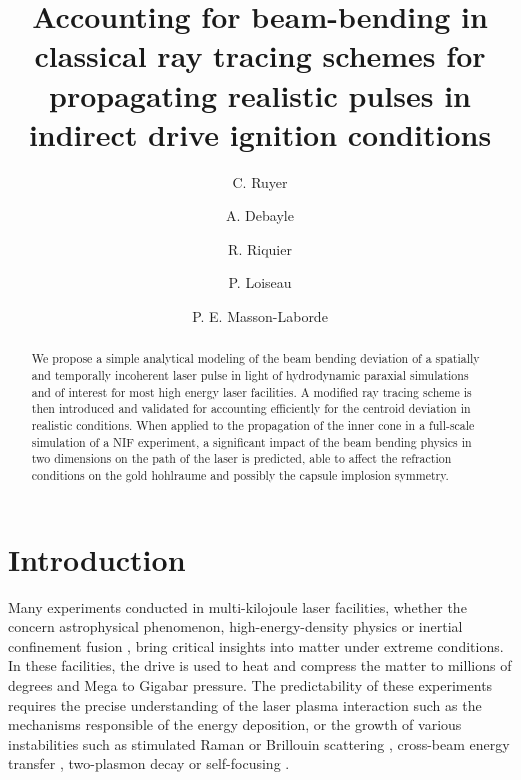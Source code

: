 \documentclass[%
 reprint,
 amsmath,amssymb,
 aps,
]{revtex4-1}
\begin{document}
\title{Accounting for  beam-bending in classical ray tracing schemes for propagating realistic pulses in indirect drive ignition conditions}
\author{C. Ruyer}
\author{A. Debayle}
\author{R. Riquier}
\author{P. Loiseau}
\author{P. E. Masson-Laborde}
\begin{abstract}
We propose a simple analytical modeling of the beam bending deviation of a spatially and temporally incoherent laser pulse in light of  hydrodynamic paraxial simulations and of interest for most high energy laser facilities.
A modified ray tracing scheme is then introduced and validated for accounting efficiently  for the centroid deviation in realistic conditions.
When applied to the propagation of the  inner cone in a full-scale simulation of a NIF experiment, a significant impact of the beam bending physics in two dimensions on the path of the laser is predicted, able to affect the refraction conditions on the gold hohlraume and possibly the capsule implosion symmetry.
\end{abstract}

\maketitle

\section{Introduction}
Many experiments conducted in multi-kilojoule laser facilities, whether the concern astrophysical phenomenon, high-energy-density physics \cite{Drake2006} or inertial confinement fusion \cite{Lindl_2004,He_2007,Cavailler_2005}, 
bring critical insights into  matter under extreme  conditions. 
In these facilities, the drive is used to heat  and compress the matter to millions of degrees and  Mega to Gigabar pressure. 
The predictability of these experiments  requires the precise understanding of the laser plasma interaction such as 
the mechanisms responsible of the energy deposition,  or   the growth of various instabilities such as stimulated Raman or Brillouin scattering  \cite{Shen_1965,Forslund_1973,POP_Liu_2009,hao_2013}, cross-beam energy transfer \cite{hao_2016}, two-plasmon decay  \cite{Dubois_1995,Russell_2001} or self-focusing  \cite{Wagner_1968}.
\end{document}
